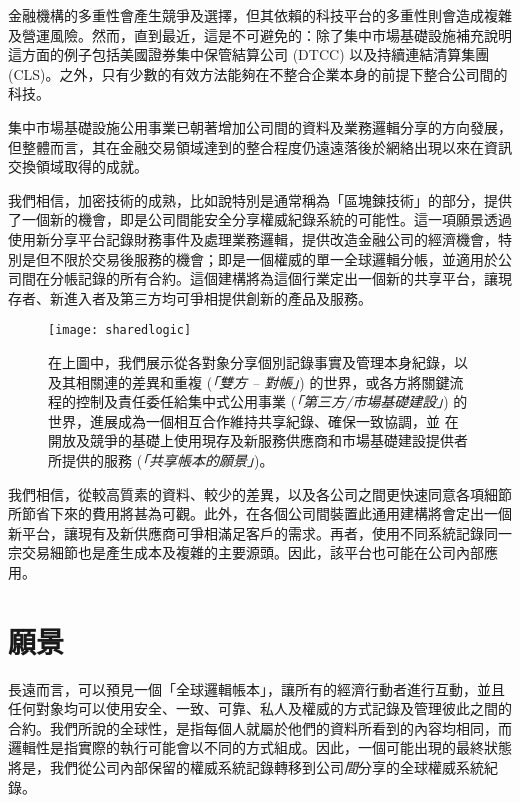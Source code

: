 ﻿\documentclass{article}
\begin{document}
金融機構的多重性會產生競爭及選擇，但其依賴的科技平台的多重性則會造成複雜及營運風險。然而，直到最近，這是不可避免的：除了集中市場基礎設施補充說明{這方面的例子包括美國證券集中保管結算公司 (DTCC) 以及持續連結清算集團 (CLS)。}之外，只有少數的有效方法能夠在不整合企業本身的前提下整合公司間的科技。

集中市場基礎設施公用事業已朝著增加公司間的資料及業務邏輯分享的方向發展，但整體而言，其在金融交易領域達到的整合程度仍遠遠落後於網絡出現以來在資訊交換領域取得的成就。\cite{IT}

我們相信，加密技術的成熟，比如說特別是通常稱為「區塊鍊技術」的部分，提供了一個新的機會，即是公司間能安全分享權威紀錄系統的可能性。這一項願景透過使用新分享平台記錄財務事件及處理業務邏輯，提供改造金融公司的經濟機會，特別是但不限於交易後服務的機會；即是一個權威的單一全球邏輯分帳，並適用於公司間在分帳記錄的所有合約。這個建構將為這個行業定出一個新的共享平台，讓現存者、新進入者及第三方均可爭相提供創新的產品及服務。 

\begin{figure}[H]
\texttt{[image: sharedlogic]} 
\caption{在上圖中，我們展示從各對象分享個別記錄事實及管理本身紀錄，以及其相關連的差異和重複 (\textit{「雙方 – 對帳」}) 的世界，或各方將關鍵流程的控制及責任委任給集中式公用事業 (\textit{「第三方/市場基礎建設」}) 的世界，進展成為一個相互合作維持共享紀錄、確保一致協調，並 在開放及競爭的基礎上使用現存及新服務供應商和市場基礎建設提供者所提供的服務 (\textit{「共享帳本的願景」})。}
\end{figure}


我們相信，從較高質素的資料、較少的差異，以及各公司之間更快速同意各項細節所節省下來的費用將甚為可觀。此外，在各個公司間裝置此通用建構將會定出一個新平台，讓現有及新供應商可爭相滿足客戶的需求。再者，使用不同系統記錄同一宗交易細節也是產生成本及複雜的主要源頭。因此，該平台也可能在公司內部應用。

\section{願景}
長遠而言，可以預見一個「全球邏輯帳本」，讓所有的經濟行動者進行互動，並且任何對象均可以使用安全、一致、可靠、私人及權威的方式記錄及管理彼此之間的合約。我們所說的全球性，是指每個人就屬於他們的資料所看到的內容均相同，而邏輯性是指實際的執行可能會以不同的方式組成。因此，一個可能出現的最終狀態將是，我們從公司內部保留的權威系統記錄轉移到公司\textit{間}分享的全球權威系統紀錄。 
\end{document}
